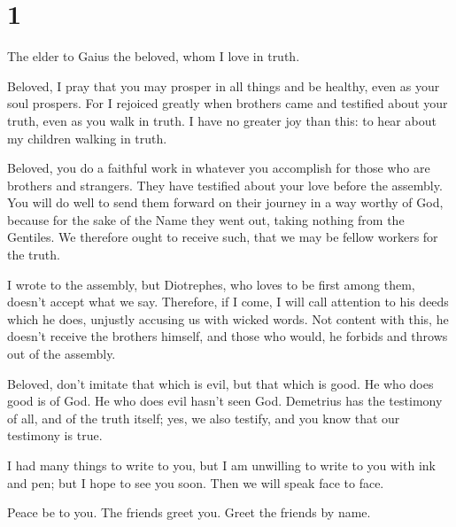 \hypertarget{section}{%
\section{1}\label{section}}

 The elder to Gaius the beloved, whom I love in truth.

 Beloved, I pray that you may prosper in all things and be
healthy, even as your soul prospers.  For I rejoiced
greatly when brothers came and testified about your truth, even as you
walk in truth.  I have no greater joy than this: to hear
about my children walking in truth.

 Beloved, you do a faithful work in whatever you
accomplish for those who are brothers and strangers.  They
have testified about your love before the assembly. You will do well to
send them forward on their journey in a way worthy of God,
 because for the sake of the Name they went out, taking
nothing from the Gentiles.  We therefore ought to receive
such, that we may be fellow workers for the truth.

 I wrote to the assembly, but Diotrephes, who loves to be
first among them, doesn't accept what we say.  Therefore,
if I come, I will call attention to his deeds which he does, unjustly
accusing us with wicked words. Not content with this, he doesn't receive
the brothers himself, and those who would, he forbids and throws out of
the assembly.

 Beloved, don't imitate that which is evil, but that
which is good. He who does good is of God. He who does evil hasn't seen
God.  Demetrius has the testimony of all, and of the
truth itself; yes, we also testify, and you know that our testimony is
true.

 I had many things to write to you, but I am unwilling to
write to you with ink and pen;  but I hope to see you
soon. Then we will speak face to face.

Peace be to you. The friends greet you. Greet the friends by name.
